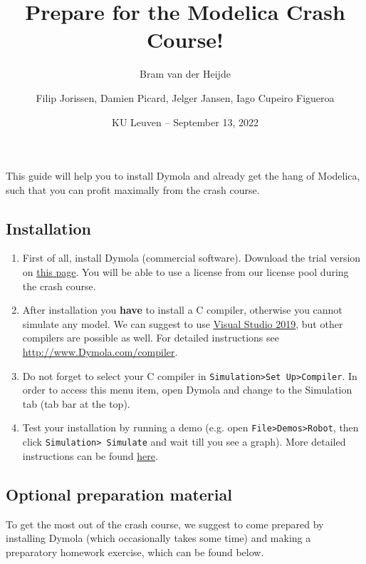 \documentclass[10pt,a4paper]{article}
\author{Bram van der Heijde}
\begin{document}
	
	\title{Prepare for the Modelica Crash Course!}
	\author{Filip Jorissen, Damien Picard, Jelger Jansen, Iago Cupeiro Figueroa} 
	\date{KU Leuven -- September 13, 2022}
	\maketitle

This guide will help you to install Dymola and already get the hang of Modelica, such that you can profit maximally from the crash course. 

\subsection*{Installation}

\begin{enumerate}
	\item First of all, install Dymola (commercial software).  Download the trial version on
	\href{https://www.3ds.com/products-services/catia/products/dymola/trial-version/}{this page}. You will be able to use a license from our license pool during the crash course. 
	\item After installation you \textbf{have} to install a C compiler, otherwise you 
	cannot simulate any model. We can suggest to use \href{https://visualstudio.microsoft.com/fr/vs/older-downloads/}{Visual Studio 2019}, but other compilers are possible as well. For detailed instructions see
	\href{http://www.Dymola.com/compiler}{http://www.Dymola.com/compiler}. 
	\item Do not forget to select your C compiler in \texttt{Simulation>Set Up>Compiler}. In order to access this menu item, open Dymola and change to the Simulation tab (tab bar at the top).
	\item Test your installation by running a demo (e.g. open \texttt{File>Demos>Robot}, then 
	click \texttt{Simulation> Simulate} and wait till you see a graph). More detailed instructions can be found \href{https://www.3ds.com/fileadmin/PRODUCTS/CATIA/DYMOLA/PDF/Installation.pdf}{here}.
\end{enumerate}


\subsection*{Optional preparation material}
To get the most out of the crash course, we suggest to come prepared by installing Dymola (which occasionally takes some time) and making a preparatory homework exercise, which can be found below. 
\end{document}
